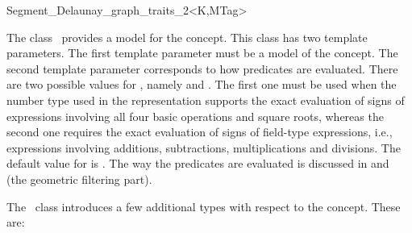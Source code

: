 


\begin{ccRefClass}{Segment_Delaunay_graph_traits_2<K,MTag>}


\ccDefinition
  
The class \ccRefName\ provides a model for the
 concept.
This class has two template parameters. The first template parameter
must be a model of the  concept. The second template
parameter corresponds to how predicates are evaluated. There are two
possible values for , namely  and
. The first one must be used when the number type
used in the representation supports the exact evaluation of signs of
expressions involving all four basic operations and square roots,
whereas the second one requires the exact evaluation of signs of
field-type expressions, i.e., expressions involving additions,
subtractions, multiplications and divisions. The default value for
 is .
%
The way the predicates are evaluated is discussed in
\cite{b-ecvdl-96} and \cite{cgal:k-reisv-04} (the geometric filtering
part).



\ccIsModel
{}

\ccTypes
{}

The \ccRefName\ class introduces a few additional types with respect
to the  concept. These are:


\end{ccRefClass}
